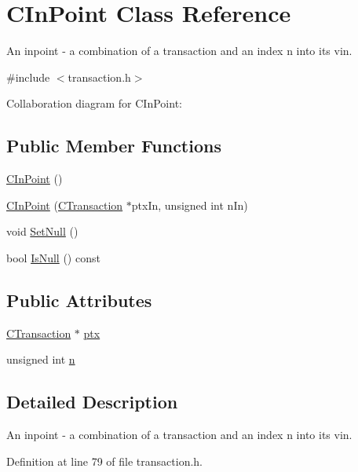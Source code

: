 \hypertarget{class_c_in_point}{}\section{C\+In\+Point Class Reference}
\label{class_c_in_point}


An inpoint -\/ a combination of a transaction and an index n into its vin.  




{\ttfamily \#include $<$transaction.\+h$>$}



Collaboration diagram for C\+In\+Point\+:
\subsection*{Public Member Functions}
\begin{DoxyCompactItemize}
\item 
\hyperlink{class_c_in_point_ad44d4164a178cd7b0ddca6dd9f862d50}{C\+In\+Point} ()
\item 
\hyperlink{class_c_in_point_ac054c350f76431079350e9e5ac18fb0f}{C\+In\+Point} (\hyperlink{class_c_transaction}{C\+Transaction} $\ast$ptx\+In, unsigned int n\+In)
\item 
void \hyperlink{class_c_in_point_af92945e76098bd920049f9f85a730e22}{Set\+Null} ()
\item 
bool \hyperlink{class_c_in_point_ab1f45ee1bda5013ccff208bf8d18d2ce}{Is\+Null} () const 
\end{DoxyCompactItemize}
\subsection*{Public Attributes}
\begin{DoxyCompactItemize}
\item 
\hyperlink{class_c_transaction}{C\+Transaction} $\ast$ \hyperlink{class_c_in_point_a2af1553adce95fa8504eb2979cbc9cf3}{ptx}
\item 
unsigned int \hyperlink{class_c_in_point_afd43eee38268aac7ff91d065697032ad}{n}
\end{DoxyCompactItemize}


\subsection{Detailed Description}
An inpoint -\/ a combination of a transaction and an index n into its vin. 

Definition at line 79 of file transaction.\+h.



